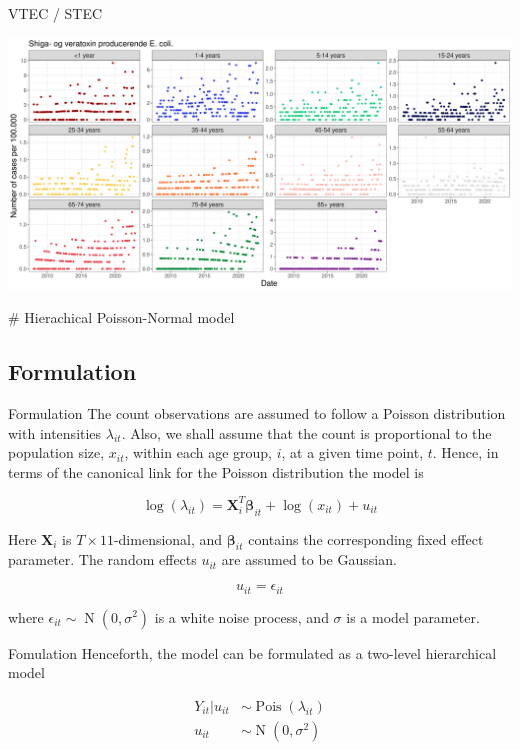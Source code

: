 \documentclass[aspectratio=169]{beamer}
\DeclareMathOperator{\N}{N}
\DeclareMathOperator{\Pois}{Pois}
\begin{document}
\begin{frame}{VTEC / STEC}
\tiny

\includegraphics[width=1\linewidth]{../figures/ShigaogveratoxinproducerendeEcolixAgeGroup}

\normalsize \# Hierachical Poisson-Normal model
\end{frame}

\hypertarget{formulation}{%
\subsection{Formulation}\label{formulation}}

\begin{frame}{Formulation}
The count observations are assumed to follow a Poisson distribution with
intensities \(\lambda_{it}\). Also, we shall assume that the count is
proportional to the population size, \(x_{it}\), within each age group,
\(i\), at a given time point, \(t\). Hence, in terms of the canonical
link for the Poisson distribution the model is

\begin{equation}
  \log(\lambda_{it})=\mathbf{X}_i^T\mathbf{\beta}_{it}+\log(x_{it})+u_{it}
\end{equation}

Here \(\mathbf{X}_i\) is \(T\times11\)-dimensional, and
\(\mathbf{\beta}_{it}\) contains the corresponding fixed effect
parameter. The random effects \(u_{it}\) are assumed to be Gaussian.

\begin{equation}
  u_{it} = \epsilon_{it}
\end{equation}

where \(\epsilon_{it}\sim\N(0,\sigma^2)\) is a white noise process, and
\(\sigma\) is a model parameter.
\end{frame}

\begin{frame}{Fomulation}
\protect\hypertarget{fomulation}{}
Henceforth, the model can be formulated as a two-level hierarchical
model

\begin{subequations}
  \begin{alignat}{2}
    Y_{it}|u_{it} &\sim \Pois (\lambda_{it}) \label{eq:pois_ln0} \\ 
    u_{it} &\sim \N(0,\sigma^2) \label{eq:pois_ln1}
  \end{alignat}
\end{subequations}
\end{frame}
\end{document}
